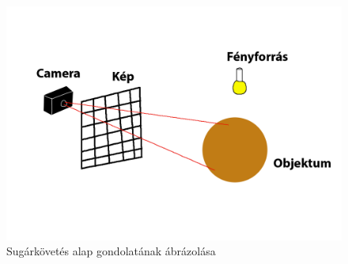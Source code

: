 \begin{figure}[h]
	\centering
	\includegraphics[width=13truecm, height=7.5truecm]{images/con2.png}
	\caption{Sugárkövetés alap gondolatának ábrázolása}
	\label{fig:con_2}
\end{figure}

\newpage
